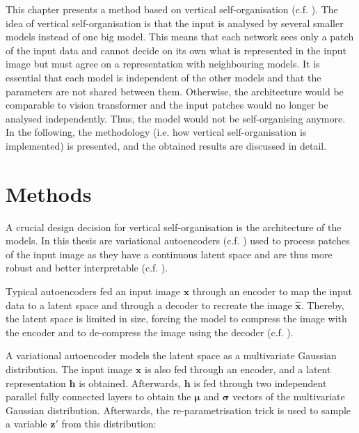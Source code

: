 This chapter presents a method based on vertical self-organisation (c.f. ).
The idea of vertical self-organisation is that the input is analysed by several smaller models instead of one big model.
This means that each network sees only a patch of the input data and cannot decide on its own what is represented in the input image but must agree on a representation with neighbouring models.
It is essential that each model is independent of the other models and that the parameters are not shared between them. Otherwise, the architecture would be comparable to vision transformer  and the input patches would no longer be analysed independently. Thus, the model would not be self-organising anymore. In the following, the methodology (i.e. how vertical self-organisation is implemented) is presented, and the obtained results are discussed in detail.

\section{Methods}
A crucial design decision for vertical self-organisation is the architecture of the models.
In this thesis are variational autoencoders  (c.f. ) used to process patches of the input image as they have a continuous latent space and are thus more robust and better interpretable (c.f. ).

Typical autoencoders fed an input image $\boldsymbol{x}$ through an encoder to map the input data to a latent space and through a decoder to recreate the image $\boldsymbol{\hat{x}}$. Thereby, the latent space is limited in size, forcing the model to compress the image with the encoder and to de-compress the image using the decoder (c.f. ).

A variational autoencoder models the latent space as a multivariate Gaussian distribution. The input image $\boldsymbol{x}$ is also fed through an encoder, and a latent representation $\boldsymbol{h}$ is obtained. Afterwards, $\boldsymbol{h}$ is fed through two independent parallel fully connected layers to obtain the $\boldsymbol{\mu}$ and $\boldsymbol{\sigma}$ vectors of the multivariate Gaussian distribution. Afterwards, the re-parametrisation trick is used to sample a variable $\boldsymbol{z}'$ from this distribution:

